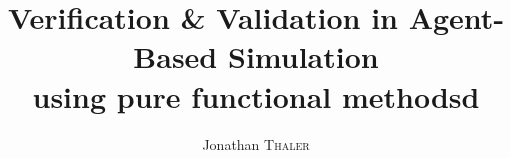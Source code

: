 \documentclass[a4paper, 10pt, conference]{IEEEtran}
\title{Verification \& Validation in Agent-Based Simulation \\ using pure functional methodsd} %
\author{Jonathan \textsc{Thaler}} %
\begin{document}
\maketitle %

\begin{abstract}

\end{abstract}









\end{document}
